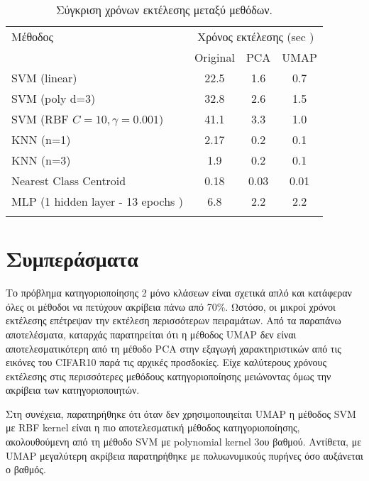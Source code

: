 \documentclass[a4paper,12pt]{article}
\newcommand{\lt}{\latintext}
\newcommand{\gt}{\greektext}
\begin{document}
\begin{table}[H]
    \centering
    \begin{tabular}{l|ccc}
    \toprule
    Μέθοδος & \multicolumn{3}{c}{Χρόνος εκτέλεσης (\lt sec \gt)} \\ 
    \cmidrule(lr){2-4}
            & \lt Original \gt & \lt PCA \gt & \lt UMAP \gt \\ 
    \midrule 
    \lt SVM (linear) \gt          & 22.5        & 1.6        & 0.7 \\
    \lt SVM (poly d=3) \gt        & 32.8       & 2.6       & 1.5 \\ 
    \lt SVM (RBF $C=10, \gamma=0.001$) \gt             & 41.1       & 3.3       & 1.0 \\
    \lt KNN (n=1) \gt             & 2.17        & 0.2       & 0.1 \\
    \lt KNN (n=3) \gt             & 1.9        & 0.2       & 0.1 \\
    \lt Nearest Class Centroid \gt & 0.18        &  0.03      & 0.01 \\
    \lt MLP (1 hidden layer - 13 epochs \gt)  & 6.8        & 2.2       & 2.2 \\ \gt
    \bottomrule
    \end{tabular}
    \caption{Σύγκριση χρόνων εκτέλεσης μεταξύ μεθόδων.}
    \label{tab:comparison}
\end{table}


\section{Συμπεράσματα}

Το πρόβλημα κατηγοριοποίησης 2 μόνο κλάσεων είναι σχετικά απλό και κατάφεραν όλες οι μέθοδοι να πετύχουν ακρίβεια πάνω από 70\%. Ωστόσο, οι μικροί χρόνοι εκτέλεσης επέτρεψαν την εκτέλεση περισσότερων πειραμάτων.
Από τα παραπάνω αποτελέσματα, καταρχάς παρατηρείται ότι η μέθοδος \lt UMAP \gt δεν είναι αποτελεσματικότερη από τη μέθοδο \lt PCA \gt στην εξαγωγή χαρακτηριστικών από τις εικόνες του \lt CIFAR10 \gt παρά
τις αρχικές προσδοκίες. Είχε καλύτερους χρόνους εκτέλεσης στις περισσότερες μεθόδους κατηγοριοποίησης μειώνοντας όμως την ακρίβεια των κατηγοριοποιητών. 

Στη συνέχεια, παρατηρήθηκε ότι όταν δεν χρησιμοποιηείται \lt UMAP \gt η μέθοδος \lt SVM \gt με \lt RBF kernel \gt είναι η πιο αποτελεσματική μέθοδος κατηγοριοποίησης, ακολουθούμενη από τη μέθοδο \lt SVM \gt με \lt polynomial kernel \gt 3ου βαθμού. 
Αντίθετα, με \lt UMAP \gt μεγαλύτερη ακρίβεια παρατηρήθηκε με πολυωνυμικούς πυρήνες όσο αυξάνεται ο βαθμός.
\end{document}

